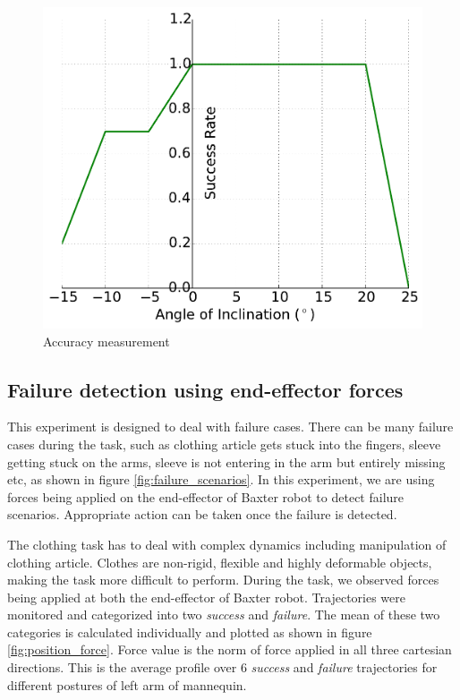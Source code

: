 \documentclass[sigconf]{acmart}
\begin{document}
\begin{figure}
	\centering
	\includegraphics[width=\linewidth]{success_rate}
	\caption{Accuracy measurement}
	\label{fig:accuracy}
\end{figure}

\subsection{Failure detection using end-effector forces}
This experiment is designed to deal with failure cases. There can be many failure cases during the task, such as clothing article gets stuck into the fingers, sleeve getting stuck on the arms, sleeve is not entering in the arm but entirely missing etc, as shown in figure \ref{fig:failure_scenarios}. In this experiment, we are using forces being applied on the end-effector of Baxter robot to detect failure scenarios. Appropriate action can be taken once the failure is detected.

The clothing task has to deal with complex dynamics including manipulation of clothing article. Clothes are non-rigid, flexible and highly deformable objects, making the task more difficult to perform. During the task, we observed forces being applied at both the end-effector of Baxter robot. Trajectories were monitored and categorized into two \textit{success} and \textit{failure}. The mean of these two categories is calculated individually and plotted as shown in figure \ref{fig:position_force}. Force value is the norm of force applied in all three cartesian directions. This is the average profile over 6 \textit{success} and \textit{failure} trajectories for different postures of left arm of mannequin. 
\end{document}
